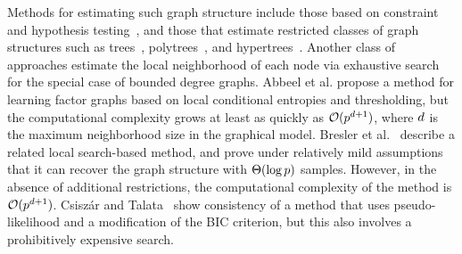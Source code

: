  Methods for estimating such graph structure include those based on constraint and hypothesis testing~\citep{spirtes:00}, and those that estimate restricted classes of graph structures such as trees~\citep{chowliu:68}, polytrees~\cite{dasgupta:99}, and hypertrees~\citep{srebro:03}. Another class of approaches estimate the local neighborhood of each node via exhaustive search for the special case of bounded degree graphs. Abbeel et al.\cite{AbbKolNg06} propose a method for learning factor graphs based on local conditional entropies and thresholding, but the computational complexity grows at least as quickly as $\mathcal{O}(p^{d+1})$, where $d$ is the maximum neighborhood size in the graphical model. Bresler et al.~\cite{Bresler08} describe a related local search-based method, and prove under relatively mild assumptions that it can recover the graph structure with $\Theta(\log p)$ samples. However, in the absence of additional restrictions, the computational complexity of the method is $\mathcal{O}(p^{d+1})$. Csisz\'{a}r and Talata~\cite{Csiszar:06} show consistency of a method that uses pseudo-likelihood and a modification of the BIC criterion, but this also involves a prohibitively expensive search.

